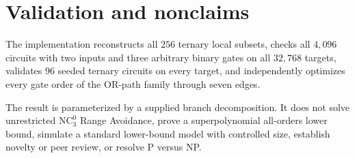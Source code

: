 \documentclass[11pt]{article}
\begin{document}
\section{Validation and nonclaims}
The implementation reconstructs all $256$ ternary local subsets, checks all $4{,}096$ circuits with two inputs and three arbitrary binary gates on all $32{,}768$ targets, validates $96$ seeded ternary circuits on every target, and independently optimizes every gate order of the OR-path family through seven edges.

The result is parameterized by a supplied branch decomposition. It does not solve unrestricted $\mathrm{NC}^0_3$ Range Avoidance, prove a superpolynomial all-orders lower bound, simulate a standard lower-bound model with controlled size, establish novelty or peer review, or resolve P versus NP.
\end{document}
